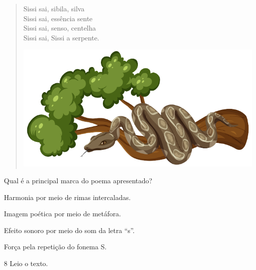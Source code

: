 \begin{myquote}
\begin{verse}
Sissi sai, sibila, silva\\
Sissi sai, essência sente\\
Sissi sai, senso, centelha\\
Sissi sai, Sissi a serpente.\\

\begin{center}
\includegraphics[width=.8\textwidth]{./media/image23l.png}
\end{center}

\end{verse}
\end{myquote}

Qual é a principal marca do poema apresentado?

\begin{escolha}
\item Harmonia por meio de rimas intercaladas.

\item Imagem poética por meio de metáfora.

\item Efeito sonoro por meio do som da letra ``s''.

\item Força pela repetição do fonema S.
\end{escolha}

\pagebreak
\num{8} Leio o texto.

